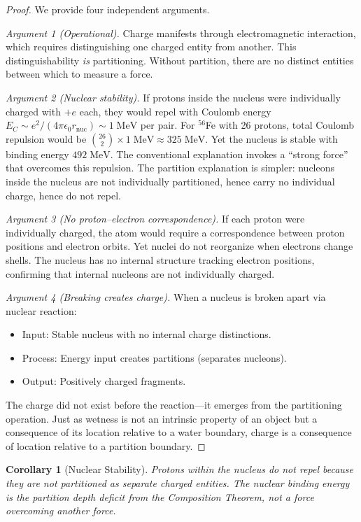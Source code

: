 \documentclass[twocolumn,10pt,a4paper]{article}
\theoremstyle{plain}
\newtheorem{corollary}[theorem]{Corollary}
\theoremstyle{definition}
\theoremstyle{remark}
\begin{document}
\begin{proof}
We provide four independent arguments.

\emph{Argument 1 (Operational).} Charge manifests through electromagnetic interaction, which requires distinguishing one charged entity from another. This distinguishability \emph{is} partitioning. Without partition, there are no distinct entities between which to measure a force.

\emph{Argument 2 (Nuclear stability).} If protons inside the nucleus were individually charged with $+e$ each, they would repel with Coulomb energy $E_C \sim e^2/(4\pi\epsilon_0 r_{\mathrm{nuc}}) \sim 1\;\mathrm{MeV}$ per pair. For $^{56}$Fe with 26 protons, total Coulomb repulsion would be $\binom{26}{2} \times 1\;\mathrm{MeV} \approx 325\;\mathrm{MeV}$. Yet the nucleus is stable with binding energy $492\;\mathrm{MeV}$. The conventional explanation invokes a ``strong force'' that overcomes this repulsion. The partition explanation is simpler: nucleons inside the nucleus are not individually partitioned, hence carry no individual charge, hence do not repel.

\emph{Argument 3 (No proton--electron correspondence).} If each proton were individually charged, the atom would require a correspondence between proton positions and electron orbits. Yet nuclei do not reorganize when electrons change shells. The nucleus has no internal structure tracking electron positions, confirming that internal nucleons are not individually charged.

\emph{Argument 4 (Breaking creates charge).} When a nucleus is broken apart via nuclear reaction:
\begin{itemize}
    \item Input: Stable nucleus with no internal charge distinctions.
    \item Process: Energy input creates partitions (separates nucleons).
    \item Output: Positively charged fragments.
\end{itemize}
The charge did not exist before the reaction---it emerges from the partitioning operation. Just as wetness is not an intrinsic property of an object but a consequence of its location relative to a water boundary, charge is a consequence of location relative to a partition boundary.
\end{proof}

\begin{corollary}[Nuclear Stability]
\label{cor:nuclear_stability}
Protons within the nucleus do not repel because they are not partitioned as separate charged entities. The nuclear binding energy is the partition depth deficit from the Composition Theorem, not a force overcoming another force.
\end{corollary}
\end{document}

